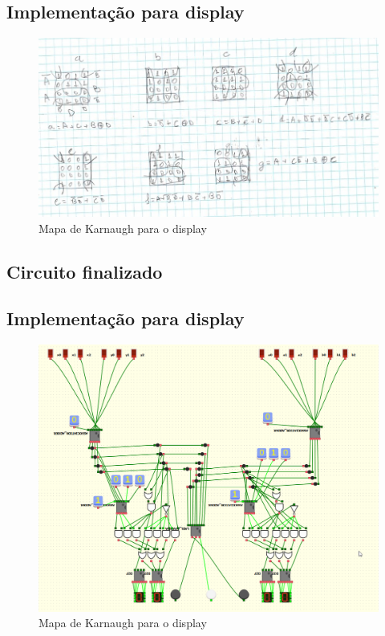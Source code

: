 \documentclass{article}
\begin{document}
\subsection{Implementação para display}
\begin{figure}[!h]
\centering
\includegraphics[width=15cm]{k.jpeg}
\caption{Mapa de Karnaugh para o display}
\label{fig:CL_logo}
\end{figure}

\subsection{Circuito finalizado}

\subsection{Implementação para display}
\begin{figure}[!h]
\centering
\includegraphics[width=15cm]{c4.png}
\caption{Mapa de Karnaugh para o display}
\label{fig:CL_logo}
\end{figure}
\end{document}
